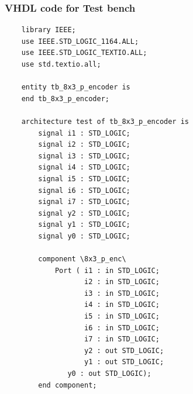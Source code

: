 \documentclass[12pt]{article}
\begin{document}
\subsubsection{VHDL code for Test bench}
\begin{verbatim}
    library IEEE;
    use IEEE.STD_LOGIC_1164.ALL;
    use IEEE.STD_LOGIC_TEXTIO.ALL;
    use std.textio.all;

    entity tb_8x3_p_encoder is
    end tb_8x3_p_encoder;

    architecture test of tb_8x3_p_encoder is
        signal i1 : STD_LOGIC;
        signal i2 : STD_LOGIC;
        signal i3 : STD_LOGIC;
        signal i4 : STD_LOGIC;
        signal i5 : STD_LOGIC;
        signal i6 : STD_LOGIC;
        signal i7 : STD_LOGIC;
        signal y2 : STD_LOGIC;
        signal y1 : STD_LOGIC;
        signal y0 : STD_LOGIC;

        component \8x3_p_enc\
            Port ( i1 : in STD_LOGIC;
                   i2 : in STD_LOGIC;
                   i3 : in STD_LOGIC;
                   i4 : in STD_LOGIC;
                   i5 : in STD_LOGIC;
                   i6 : in STD_LOGIC;
                   i7 : in STD_LOGIC;
                   y2 : out STD_LOGIC;
                   y1 : out STD_LOGIC;
    	       y0 : out STD_LOGIC);
        end component;


\end{verbatim}
\end{document}
